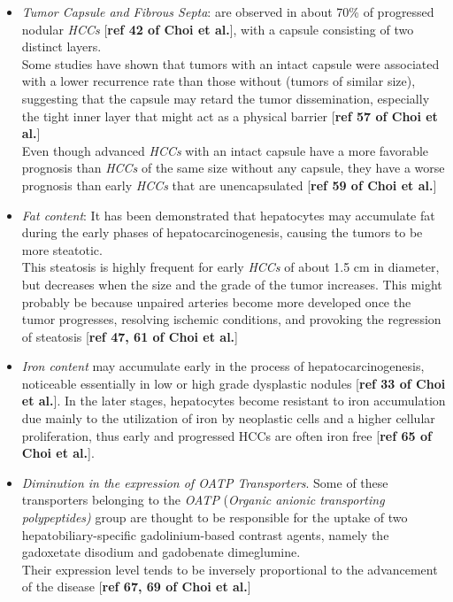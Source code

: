 \documentclass[]{article}
\providecommand{\tightlist}{%
  \setlength{\itemsep}{0pt}\setlength{\parskip}{0pt}}
\begin{document}
\begin{itemize}
\tightlist
\item
  \emph{Tumor Capsule and Fibrous Septa}: are observed in about 70\% of
  progressed nodular \emph{HCCs} {[}\textbf{ref 42 of Choi et al.}{]},
  with a capsule consisting of two distinct layers.\\
  Some studies have shown that tumors with an intact capsule were
  associated with a lower recurrence rate than those without (tumors of
  similar size), suggesting that the capsule may retard the tumor
  dissemination, especially the tight inner layer that might act as a
  physical barrier {[}\textbf{ref 57 of Choi et al.}{]}\\
  Even though advanced \emph{HCCs} with an intact capsule have a more
  favorable prognosis than \emph{HCCs} of the same size without any
  capsule, they have a worse prognosis than early \emph{HCCs} that are
  unencapsulated {[}\textbf{ref 59 of Choi et al.}{]}
\item
  \emph{Fat content}: It has been demonstrated that hepatocytes may
  accumulate fat during the early phases of hepatocarcinogenesis,
  causing the tumors to be more steatotic.\\
  This steatosis is highly frequent for early \emph{HCCs} of about 1.5
  cm in diameter, but decreases when the size and the grade of the tumor
  increases. This might probably be because unpaired arteries become
  more developed once the tumor progresses, resolving ischemic
  conditions, and provoking the regression of steatosis {[}\textbf{ref
  47, 61 of Choi et al.}{]}
\item
  \emph{Iron content} may accumulate early in the process of
  hepatocarcinogenesis, noticeable essentially in low or high grade
  dysplastic nodules {[}\textbf{ref 33 of Choi et al.}{]}. In the later
  stages, hepatocytes become resistant to iron accumulation due mainly
  to the utilization of iron by neoplastic cells and a higher cellular
  proliferation, thus early and progressed HCCs are often iron free
  {[}\textbf{ref 65 of Choi et al.}{]}.
\item
  \emph{Diminution in the expression of OATP Transporters}. Some of
  these transporters belonging to the \emph{OATP} (\emph{Organic anionic
  transporting polypeptides)} group are thought to be responsible for
  the uptake of two hepatobiliary-specific gadolinium-based contrast
  agents, namely the gadoxetate disodium\emph{ }and\emph{ }gadobenate
  dimeglumine.\\
  Their expression level tends to be inversely proportional to the
  advancement of the disease {[}\textbf{ref 67, 69 of Choi et al.}{]}
\end{itemize}
\end{document}
